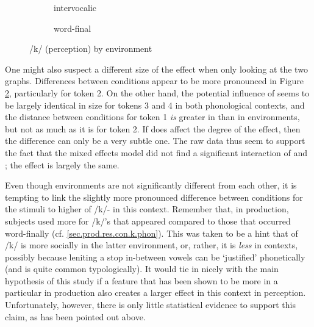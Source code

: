\begin{figure}[h]
	\centering
	\begin{subfigure}{0.49\textwidth}
		\centering
			\resizebox{\linewidth}{!}{} 
		\caption{intervocalic}
		\label{fig.bar.k.ext.intervoc}
	\end{subfigure}
	\begin{subfigure}{0.49\textwidth}
		\centering
			\resizebox{\linewidth}{!}{}
		\caption{word-final}
		\label{fig.bar.k.ext.wordfinal}
	\end{subfigure}
	\caption{/k/ (perception) by environment}
	\label{fig.bar.k.ext.environment}
\end{figure}

One might also suspect a different size of the  effect when only looking at the two graphs.
Differences between conditions appear to be more pronounced in Figure \ref{fig.bar.k.ext.wordfinal}, particularly for token 2.
On the other hand, the potential influence of  seems to be largely identical in size for tokens 3 and 4 in both phonological contexts, and the distance between conditions for token 1 \emph{is} greater in  than in  environments, but not as much as it is for token 2.
If  does affect the degree of the  effect, then the difference can only be a very subtle one.
The raw data thus seem to support the fact that the mixed effects model did not find a significant interaction of  and ; the effect is largely the same.

Even though environments are not significantly different from each other, it is tempting to link the slightly more pronounced difference between  conditions for the  stimuli to higher  of /k/- in this context.
Remember that, in production, subjects used more  for /k/'s that appeared  compared to those that occurred word-finally (cf. \ref{sec.prod.res.con.k.phon}).
This was taken to be a hint that  of /k/ is more socially  in the latter environment, or, rather, it is \emph{less}  in  contexts, possibly because leniting a stop in-between vowels can be `justified' phonetically (and is quite common typologically).
It would tie in nicely with the main hypothesis of this study if a feature that has been shown to be more  in a particular  in production also creates a larger  effect in this context in perception.
Unfortunately, however, there is only little statistical evidence to support this claim, as has been pointed out above.

